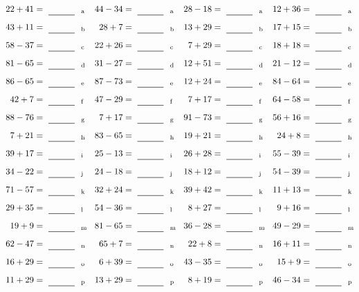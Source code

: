 \documentclass
[
  draft    = true,
  fontsize = 11pt,
  parskip  = half-
]
{scrartcl}
\begin{document}
\clearpage
\begin{align*}
    \pline{22+41}&=\rline{a}
  & \pline{44-34}&=\rline{a}
  & \pline{28-18}&=\rline{a}
  & \pline{12+36}&=\rline{a} \\[1ex]
    \pline{43+11}&=\rline{b}
  & \pline{28+7}&=\rline{b}
  & \pline{13+29}&=\rline{b}
  & \pline{17+15}&=\rline{b} \\[1ex]
    \pline{58-37}&=\rline{c}
  & \pline{22+26}&=\rline{c}
  & \pline{7+29}&=\rline{c}
  & \pline{18+18}&=\rline{c} \\[1ex]
    \pline{81-65}&=\rline{d}
  & \pline{31-27}&=\rline{d}
  & \pline{12+51}&=\rline{d}
  & \pline{21-12}&=\rline{d} \\[1ex]
    \pline{86-65}&=\rline{e}
  & \pline{87-73}&=\rline{e}
  & \pline{12+24}&=\rline{e}
  & \pline{84-64}&=\rline{e} \\[1ex]
    \pline{42+7}&=\rline{f}
  & \pline{47-29}&=\rline{f}
  & \pline{7+17}&=\rline{f}
  & \pline{64-58}&=\rline{f} \\[1ex]
    \pline{88-76}&=\rline{g}
  & \pline{7+17}&=\rline{g}
  & \pline{91-73}&=\rline{g}
  & \pline{56+16}&=\rline{g} \\[1ex]
    \pline{7+21}&=\rline{h}
  & \pline{83-65}&=\rline{h}
  & \pline{19+21}&=\rline{h}
  & \pline{24+8}&=\rline{h} \\[1ex]
    \pline{39+17}&=\rline{i}
  & \pline{25-13}&=\rline{i}
  & \pline{26+28}&=\rline{i}
  & \pline{55-39}&=\rline{i} \\[1ex]
    \pline{34-22}&=\rline{j}
  & \pline{24-18}&=\rline{j}
  & \pline{18+12}&=\rline{j}
  & \pline{54-39}&=\rline{j} \\[1ex]
    \pline{71-57}&=\rline{k}
  & \pline{32+24}&=\rline{k}
  & \pline{39+42}&=\rline{k}
  & \pline{11+13}&=\rline{k} \\[1ex]
    \pline{29+35}&=\rline{l}
  & \pline{54-36}&=\rline{l}
  & \pline{8+27}&=\rline{l}
  & \pline{9+16}&=\rline{l} \\[1ex]
    \pline{19+9}&=\rline{m}
  & \pline{81-65}&=\rline{m}
  & \pline{36-28}&=\rline{m}
  & \pline{49-29}&=\rline{m} \\[1ex]
    \pline{62-47}&=\rline{n}
  & \pline{65+7}&=\rline{n}
  & \pline{22+8}&=\rline{n}
  & \pline{16+11}&=\rline{n} \\[1ex]
    \pline{16+29}&=\rline{o}
  & \pline{6+39}&=\rline{o}
  & \pline{43-35}&=\rline{o}
  & \pline{15+9}&=\rline{o} \\[1ex]
    \pline{11+29}&=\rline{p}
  & \pline{13+29}&=\rline{p}
  & \pline{8+19}&=\rline{p}
  & \pline{46-34}&=\rline{p}
\end{align*}
\end{document}
